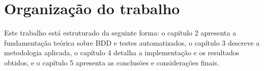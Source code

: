 



\section{Organização do trabalho}
Este trabalho está estruturado da seguinte forma: o capítulo 2 apresenta a fundamentação teórica sobre BDD e testes automatizados, 
o capítulo 3 descreve a metodologia aplicada, o capítulo 4 detalha a implementação e os resultados obtidos, e o capítulo 5 apresenta as conclusões e considerações finais.
